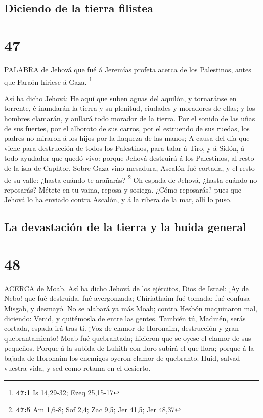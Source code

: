 \hypertarget{diciendo-de-la-tierra-filistea}{%
\subsection{Diciendo de la tierra
filistea}\label{diciendo-de-la-tierra-filistea}}

\hypertarget{section-46}{%
\section{47}\label{section-46}}

 PALABRA de Jehová que fué á Jeremías profeta acerca de los
Palestinos, antes que Faraón hiriese á Gaza. \footnote{\textbf{47:1} Is
  14,29-32; Ezeq 25,15-17}

 Así ha dicho Jehová: He aquí que suben aguas del aquilón, y
tornaránse en torrente, é inundarán la tierra y su plenitud, ciudades y
moradores de ellas; y los hombres clamarán, y aullará todo morador de la
tierra.  Por el sonido de las uñas de sus fuertes, por el
alboroto de sus carros, por el estruendo de sus ruedas, los padres no
miraron á los hijos por la flaqueza de las manos;  A causa
del día que viene para destrucción de todos los Palestinos, para talar á
Tiro, y á Sidón, á todo ayudador que quedó vivo: porque Jehová destruirá
á los Palestinos, al resto de la isla de Caphtor.  Sobre
Gaza vino mesadura, Ascalón fué cortada, y el resto de su valle: ¿hasta
cuándo te arañarás? \footnote{\textbf{47:5} Am 1,6-8; Sof 2,4; Zac 9,5;
  Jer 41,5; Jer 48,37}  Oh espada de Jehová, ¿hasta cuándo
no reposarás? Métete en tu vaina, reposa y sosiega.  ¿Cómo
reposarás? pues que Jehová lo ha enviado contra Ascalón, y á la ribera
de la mar, allí lo puso.

\hypertarget{la-devastaciuxf3n-de-la-tierra-y-la-huida-general}{%
\subsection{La devastación de la tierra y la huida
general}\label{la-devastaciuxf3n-de-la-tierra-y-la-huida-general}}

\hypertarget{section-47}{%
\section{48}\label{section-47}}

 ACERCA de Moab. Así ha dicho Jehová de los ejércitos, Dios
de Israel: ¡Ay de Nebo! que fué destruída, fué avergonzada; Chîriathaim
fué tomada; fué confusa Misgab, y desmayó.  No se alabará ya
más Moab; contra Hesbón maquinaron mal, diciendo: Venid, y quitémosla de
entre las gentes. También tú, Madmén, serás cortada, espada irá tras ti.
 ¡Voz de clamor de Horonaim, destrucción y gran
quebrantamiento!  Moab fué quebrantada; hicieron que se
oyese el clamor de sus pequeños.  Porque á la subida de
Luhith con lloro subirá el que llora; porque á la bajada de Horonaim los
enemigos oyeron clamor de quebranto.  Huid, salvad vuestra
vida, y sed como retama en el desierto.

